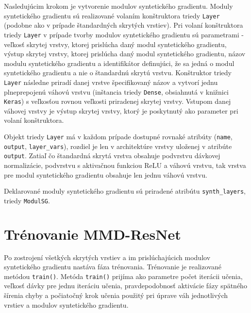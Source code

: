 Nasledujúcim krokom je vytvorenie modulov syntetického gradientu. Moduly syntetického gradientu sú realizované volaním konštruktora triedy \texttt{Layer} (podobne ako v prípade štandardných skrytých vrstiev). Pri volaní konštruktora triedy \texttt{Layer} v prípade tvorby modulov syntetického gradientu sú parametrami - veľkosť skrytej vrstvy, ktorej prislúcha daný modul syntetického gradientu, výstup skrytej vrstvy, ktorej prislúcha daný modul syntetického gradientu, názov modulu syntetického gradientu a identifikátor definujúci, že sa jedná o modul syntetického gradientu a nie o štandardnú skrytú vrstvu. Konštruktor triedy \texttt{Layer} následne priradí danej vrstve špecifikovaný názov a vytvorí jednu plneprepojenú váhovú vrstvu (inštancia triedy \texttt{Dense}, obsiahnutá v knižnici \texttt{Keras}) s veľkosťou rovnou veľkosti priradenej skrytej vrstvy. Vstupom danej váhovej vrstvy je výstup skrytej vrstvy, ktorý je poskytnutý ako parameter pri volaní konštruktora. 

Objekt triedy \texttt{Layer} má v každom prípade dostupné rovnaké atribúty (\texttt{name}, \texttt{output}, \texttt{layer_vars}), rozdiel je len v architektúre vrstvy uloženej v atribúte \texttt{output}. Zatiaľ čo štandardná skrytá vrstva obsahuje podvrstvu dávkovej normalizácie, podvrstvu s aktivačnou funkciou ReLU a váhovú vrstvu, tak vrstva pre modul syntetického gradientu obsahuje len jednu váhovú vrstvu.

Deklarované moduly syntetického gradientu sú priradené atribútu \texttt{synth_layers}, triedy \texttt{ModulSG}.

\section{Trénovanie MMD-ResNet}
\label{implementacia_trenovania_MMD_ResNet}

Po zostrojení všetkých skrytých vrstiev a im prislúchajúcich modulov syntetického gradientu nastáva fáza trénovania. Trénovanie je realizované metódou \texttt{train()}. Metóda \texttt{train()} prijíma ako parametre počet iterácii učenia, veľkosť dávky pre jednu iteráciu učenia, pravdepodobnosť aktivácie fázy spätného šírenia chyby a počiatočný krok učenia použitý pri úprave váh jednotlivých vrstiev a modulov syntetického gradientu.


